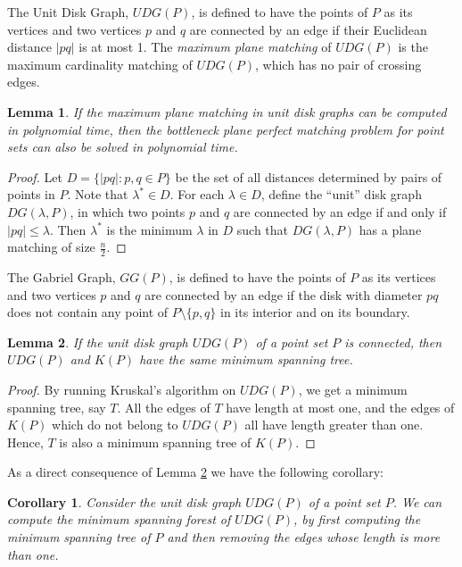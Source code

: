 \documentclass[11pt,a4paper]{article}
\newcommand{\bt}{\lambda}
\newcommand{\btopt}{\lambda^*}
\newtheorem{lemma}{Lemma}
\newtheorem{corollary}{Corollary}
\begin{document}
The Unit Disk Graph, $UDG(P)$, is defined to have the points of $P$ as its vertices and two vertices $p$ and $q$ are connected by an edge if their Euclidean distance $|pq|$ is at most 1. The {\em maximum plane matching} of $UDG(P)$ is the maximum cardinality matching of $UDG(P)$, which has no pair of crossing edges. 

\begin{lemma}
 If the maximum plane matching in unit disk graphs can be computed in polynomial time, then the bottleneck plane perfect matching problem for point sets can also be solved in polynomial time.
\end{lemma}
\begin{proof}
Let $D=\{|pq|:p,q\in P\}$ be the set of all distances determined by pairs of points in $P$. Note that $\btopt\in D$. For each $\bt\in D$, define the ``unit'' disk graph $DG(\bt,P)$, in which two points $p$ and $q$ are connected by an edge if and only if $|pq|\le\bt$. Then $\btopt$ is the minimum $\bt$ in $D$ such that $DG(\bt,P)$ has a plane matching of size $\frac{n}{2}$.
\end{proof}



The Gabriel Graph, $GG(P)$, is defined to have the points of $P$ as its vertices and two vertices $p$ and $q$ are connected by an edge if the disk with diameter $pq$ does not contain any point of $P\setminus\{p,q\}$ in its interior and on its boundary.

\begin{lemma}
\label{MST-UDG}
If the unit disk graph $UDG(P)$ of a point set $P$ is connected, then $UDG(P)$ and $K(P)$ have the same minimum spanning tree.
\end{lemma}
\begin{proof}
 By running Kruskal's algorithm on $UDG(P)$, we get a minimum spanning tree, say $T$. All the edges of $T$ have length at most one, and the edges of $K(P)$ which do not belong to $UDG(P)$ all have length greater than one. Hence, $T$ is also a minimum spanning tree of $K(P)$.
\end{proof}

As a direct consequence of Lemma \ref{MST-UDG} we have the following corollary:

\begin{corollary}
\label{MST-DEL}
Consider the unit disk graph $UDG(P)$ of a point set $P$. We can compute the minimum spanning forest of $UDG(P)$, by first computing the minimum spanning tree of $P$ and then removing the edges whose length is more than one.
\end{corollary}
\end{document}
